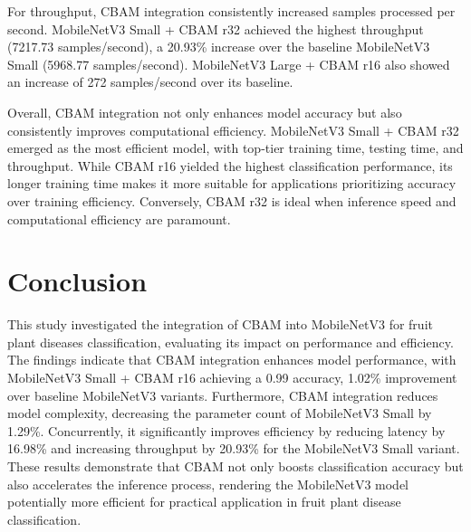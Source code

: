 \documentclass[preprint,12pt]{elsarticle}
\begin{document}
For throughput, CBAM integration consistently increased samples processed per second. MobileNetV3 Small + CBAM r32 achieved the highest throughput (7217.73 samples/second), a 20.93\% increase over the baseline MobileNetV3 Small (5968.77 samples/second). MobileNetV3 Large + CBAM r16 also showed an increase of 272 samples/second over its baseline.

Overall, CBAM integration not only enhances model accuracy but also consistently improves computational efficiency. MobileNetV3 Small + CBAM r32 emerged as the most efficient model, with top-tier training time, testing time, and throughput. While CBAM r16 yielded the highest classification performance, its longer training time makes it more suitable for applications prioritizing accuracy over training efficiency. Conversely, CBAM r32 is ideal when inference speed and computational efficiency are paramount.

\section{Conclusion}

This study investigated the integration of CBAM into MobileNetV3 for fruit plant diseases classification, evaluating its impact on performance and efficiency. The findings indicate that CBAM integration enhances model performance, with MobileNetV3 Small + CBAM r16 achieving a 0.99 accuracy, 1.02\% improvement over baseline MobileNetV3 variants.
Furthermore, CBAM integration reduces model complexity, decreasing the parameter count of MobileNetV3 Small by 1.29\%. Concurrently, it significantly improves efficiency by reducing latency by 16.98\% and increasing throughput by 20.93\% for the MobileNetV3 Small variant. These results demonstrate that CBAM not only boosts classification accuracy but also accelerates the inference process, rendering the MobileNetV3 model potentially more efficient for practical application in fruit plant disease classification.


  
 
\end{document}
